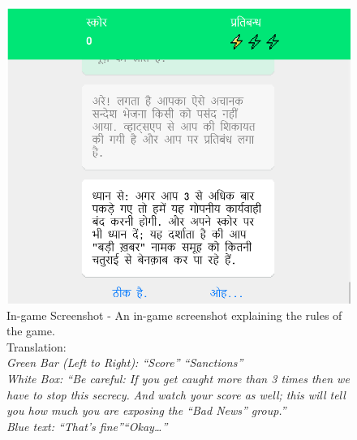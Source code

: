 \documentclass[empirical, authordate, issue]{jote-new-article}
\begin{document}
\begin{figure}

  \includegraphics[width=\linewidth]{media/supplement/images6.jpeg}

  \caption{In-game Screenshot - An in-game screenshot explaining the rules of the game. \\
    Translation: \\
    \emph{Green Bar (Left to Right): “Score” “Sanctions”} \\
    \emph{White Box: “Be careful: If you get caught more than 3 times then we have to stop this secrecy. }\emph{And watch your score as well; this will tell you how much you are exposing the “Bad News” group.”} \\
    \emph{Blue text: “That's fine”}\emph{}\emph{“Okay…”}
  }
  \label{}


\end{figure}












\clearpage
\end{document}
